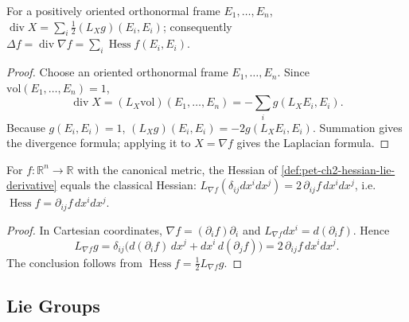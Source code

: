 \begin{proposition}
  \label{prop:pet-ch2-divergence-trace-formula}
  \leanok
  For a positively oriented orthonormal frame $E_1,\dots,E_n$,
  $\operatorname{div}X=\sum_i\frac12(L_Xg)(E_i,E_i)$; consequently
  $\Delta f=\operatorname{div}\nabla f=\sum_i\operatorname{Hess}f(E_i,E_i)$.
\end{proposition}
\begin{proof}
  \leanok
  \sketch
  Choose an oriented orthonormal
  frame $E_1,\dots,E_n$. Since
  $\mathrm{vol}(E_1,\dots,E_n)=1$,
  \[
    \operatorname{div}X
      =(L_X\mathrm{vol})(E_1,\dots,E_n)
      =-\sum_i g(L_XE_i,E_i).
  \]
  Because $g(E_i,E_i)=1$,
  $(L_Xg)(E_i,E_i)=-2g(L_XE_i,E_i)$. Summation gives the divergence
  formula; applying it to $X=\nabla f$ gives the Laplacian formula.
\end{proof}

\begin{proposition}
  \label{prop:pet-ch2-hessian-euclidean-agreement}
  \leanok
  For $f:\mathbb{R}^n\to\mathbb{R}$ with the canonical metric, the Hessian of
  \cref{def:pet-ch2-hessian-lie-derivative} equals the classical Hessian:
  $L_{\nabla f}(\delta_{ij}dx^idx^j)=2\,\partial_{ij}f\,dx^idx^j$, i.e.
  $\operatorname{Hess}f=\partial_{ij}f\,dx^idx^j$.
\end{proposition}
\begin{proof}
  \leanok
  \sketch
  In Cartesian coordinates,
  $\nabla f=(\partial_i f)\partial_i$ and
  $L_{\nabla f}dx^i=d(\partial_i f)$. Hence
  \[
    L_{\nabla f}g
      =\delta_{ij}\big(d(\partial_i f)\,dx^j
                       +dx^i\,d(\partial_j f)\big)
      =2\,\partial_{ij}f\,dx^i dx^j.
  \]
  The conclusion follows from
  $\operatorname{Hess}f=\tfrac12L_{\nabla f}g$.
\end{proof}

\subsection{Lie Groups}

